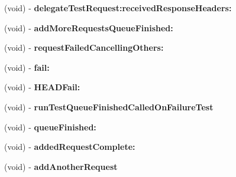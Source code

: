 \begin{DoxyCompactItemize}
\item 
\hypertarget{interface_a_s_i_network_queue_tests_07_08_a46a23624618c0547cbcbb9ca82c798cb}{
(void) -\/ {\bfseries delegate\-Test\-Request\-:received\-Response\-Headers\-:}}
\label{interface_a_s_i_network_queue_tests_07_08_a46a23624618c0547cbcbb9ca82c798cb}

\item 
\hypertarget{interface_a_s_i_network_queue_tests_07_08_abe54bb28f6c58b48f2e136adebe7591c}{
(void) -\/ {\bfseries add\-More\-Requests\-Queue\-Finished\-:}}
\label{interface_a_s_i_network_queue_tests_07_08_abe54bb28f6c58b48f2e136adebe7591c}

\item 
\hypertarget{interface_a_s_i_network_queue_tests_07_08_ac13a2a0cfd430c066079f46e968de949}{
(void) -\/ {\bfseries request\-Failed\-Cancelling\-Others\-:}}
\label{interface_a_s_i_network_queue_tests_07_08_ac13a2a0cfd430c066079f46e968de949}

\item 
\hypertarget{interface_a_s_i_network_queue_tests_07_08_a672f203e09f2d4f39fb2f1824cd85443}{
(void) -\/ {\bfseries fail\-:}}
\label{interface_a_s_i_network_queue_tests_07_08_a672f203e09f2d4f39fb2f1824cd85443}

\item 
\hypertarget{interface_a_s_i_network_queue_tests_07_08_abebd73c6087a317cf7d40a0694fa0554}{
(void) -\/ {\bfseries \-H\-E\-A\-D\-Fail\-:}}
\label{interface_a_s_i_network_queue_tests_07_08_abebd73c6087a317cf7d40a0694fa0554}

\item 
\hypertarget{interface_a_s_i_network_queue_tests_07_08_a863286b45c212a9aff1fd8c9415e8eb8}{
(void) -\/ {\bfseries run\-Test\-Queue\-Finished\-Called\-On\-Failure\-Test}}
\label{interface_a_s_i_network_queue_tests_07_08_a863286b45c212a9aff1fd8c9415e8eb8}

\item 
\hypertarget{interface_a_s_i_network_queue_tests_07_08_a7d969cf7beaae41da4ec7ee5d2f524d4}{
(void) -\/ {\bfseries queue\-Finished\-:}}
\label{interface_a_s_i_network_queue_tests_07_08_a7d969cf7beaae41da4ec7ee5d2f524d4}

\item 
\hypertarget{interface_a_s_i_network_queue_tests_07_08_ab8add5e0479640989a141e56dfcf046a}{
(void) -\/ {\bfseries added\-Request\-Complete\-:}}
\label{interface_a_s_i_network_queue_tests_07_08_ab8add5e0479640989a141e56dfcf046a}

\item 
\hypertarget{interface_a_s_i_network_queue_tests_07_08_a7f9925729daa7cce26bd2301d1b86c2b}{
(void) -\/ {\bfseries add\-Another\-Request}}
\label{interface_a_s_i_network_queue_tests_07_08_a7f9925729daa7cce26bd2301d1b86c2b}


\end{DoxyCompactItemize}
